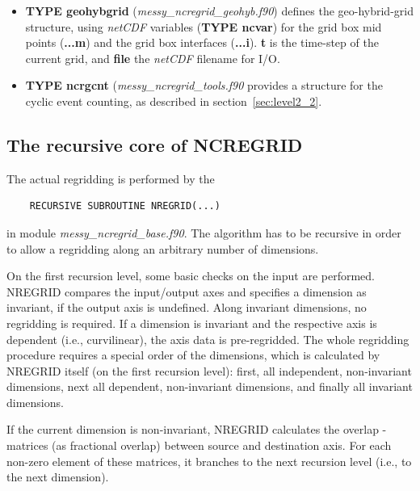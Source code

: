 \documentclass[12pt, a4paper]{article}
\begin{document}
\begin{itemize}
      {\it netCDF} input/output into/from these structures, such as
      \begin{verbatim}
             SUBROUTINE IMPORT_NCDIM(...)
             SUBROUTINE EXPORT_NCDIM(...)
             SUBROUTINE IMPORT_NCATT(...)
             SUBROUTINE EXPORT_NCATT(...)
             SUBROUTINE IMPORT_NCVAR(...)
             SUBROUTINE EXPORT_NCVAR(...)
      \end{verbatim}
%
\item {\bf TYPE geohybgrid} ({\it messy\_ncregrid\_geohyb.f90}) defines
      the geo-hybrid-grid structure, using {\it netCDF} variables
      ({\bf TYPE ncvar}) for the grid box mid points ({\bf ...m}) and the
      grid box interfaces ({\bf ...i}).
      {\bf t} is the time-step of the current grid, and {\bf file}
      the {\it netCDF} filename for I/O.
%
\item {\bf TYPE ncrgcnt} ({\it messy\_ncregrid\_tools.f90} provides a
      structure for the cyclic event counting, as described in
      section~\ref{sec:level2_2}.
%
\end{itemize}

\subsection{The recursive core of NCREGRID}
\label{sec:nregrid}
The actual regridding is performed by the
\begin{verbatim}
    RECURSIVE SUBROUTINE NREGRID(...)
\end{verbatim}
in module {\it messy\_ncregrid\_base.f90}. The algorithm has to be recursive
in order to allow a regridding along an arbitrary number of dimensions.

On the first recursion level, some basic checks on the input are performed.
NREGRID compares the input/output axes and specifies a dimension
as invariant, if the output axis is undefined. Along invariant dimensions,
no regridding is required.
If a dimension is invariant and the respective axis is dependent
(i.e., curvilinear), the axis data is pre-regridded.
The whole regridding procedure requires a special
order of the dimensions, which is calculated by NREGRID itself
(on the first recursion level): first, all independent, non-invariant
dimensions, next all dependent, non-invariant dimensions, and finally all
invariant dimensions.
 
If the current dimension is non-invariant,
NREGRID calculates the overlap - matrices (as fractional overlap)
between source and destination axis. For each non-zero element of
these matrices, it branches to the next recursion level (i.e., to the
next dimension).
\end{document}
